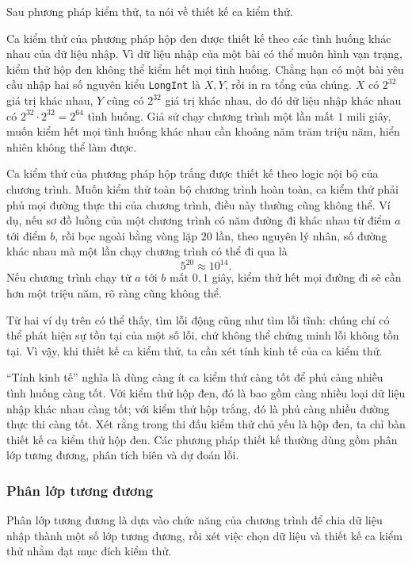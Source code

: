 \documentclass[11pt]{article}
\begin{document}
Sau phương pháp kiểm thử, ta nói về thiết kế ca kiểm thử.

Ca kiểm thử của phương pháp hộp đen được thiết kế theo các tình huống khác
nhau của dữ liệu nhập. Vì dữ liệu nhập của một bài có thể muôn hình vạn
trạng, kiểm thử hộp đen không thể kiểm hết mọi tình huống. Chẳng hạn có một
bài yêu cầu nhập hai số nguyên kiểu \texttt{LongInt} là \(X,Y\), rồi in ra
tổng của chúng. \(X\) có \(2^{32}\) giá trị khác nhau, \(Y\) cũng có \(2^{32}\)
giá trị khác nhau, do đó dữ liệu nhập khác nhau có \(2^{32}\cdot2^{32}=2^{64}\)
tình huống. Giả sử chạy chương trình một lần mất \(1\) mili giây, muốn kiểm
hết mọi tình huống khác nhau cần khoảng năm trăm triệu năm, hiển nhiên không
thể làm được.

Ca kiểm thử của phương pháp hộp trắng được thiết kế theo logic nội bộ của
chương trình. Muốn kiểm thử toàn bộ chương trình hoàn toàn, ca kiểm thử phải
phủ mọi đường thực thi của chương trình, điều này thường cũng không thể. Ví
dụ, nếu sơ đồ luồng của một chương trình có năm đường đi khác nhau từ điểm
\(a\) tới điểm \(b\), rồi bọc ngoài bằng vòng lặp \(20\) lần, theo nguyên lý
nhân, số đường khác nhau mà một lần chạy chương trình có thể đi qua là
\[
  5^{20}\approx 10^{14}.
\]
Nếu chương trình chạy từ \(a\) tới \(b\) mất \(0{,}1\) giây, kiểm thử hết mọi
đường đi sẽ cần hơn một triệu năm, rõ ràng cũng không thể.

Từ hai ví dụ trên có thể thấy, tìm lỗi động cũng như tìm lỗi tĩnh: chúng chỉ
có thể phát hiện sự tồn tại của một số lỗi, chứ không thể chứng minh lỗi
không tồn tại. Vì vậy, khi thiết kế ca kiểm thử, ta cần xét tính kinh tế của
ca kiểm thử.

``Tính kinh tế'' nghĩa là dùng càng ít ca kiểm thử càng tốt để phủ càng nhiều
tình huống càng tốt. Với kiểm thử hộp đen, đó là bao gồm càng nhiều loại dữ
liệu nhập khác nhau càng tốt; với kiểm thử hộp trắng, đó là phủ càng nhiều
đường thực thi càng tốt. Xét rằng trong thi đấu kiểm thử chủ yếu là hộp đen,
ta chỉ bàn thiết kế ca kiểm thử hộp đen. Các phương pháp thiết kế thường dùng
gồm phân lớp tương đương, phân tích biên và dự đoán lỗi.

\subsubsection{Phân lớp tương đương}

Phân lớp tương đương là dựa vào chức năng của chương trình để chia dữ liệu
nhập thành một số lớp tương đương, rồi xét việc chọn dữ liệu và thiết kế ca
kiểm thử nhằm đạt mục đích kiểm thử.
\end{document}
